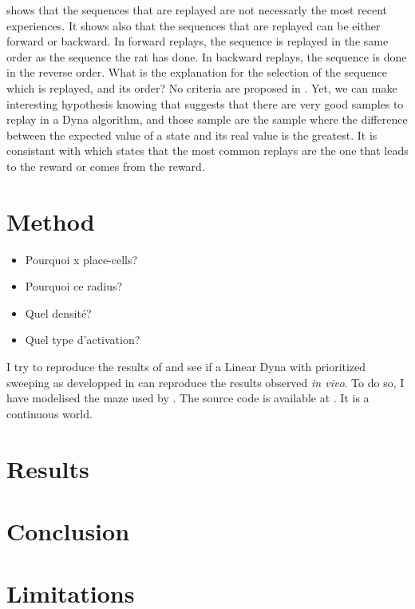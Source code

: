 \documentclass[]{article}
\newcommand\bla[1]{\ifthenelse{\isempty{#1}}{\hl{**~bla~bla~**}}{\hl{**~#1~**}}}
\begin{document}
\textcite{gupta_hippocampal_2010} shows that the sequences that are replayed are not necessarly the most recent experiences. It shows also that the sequences that are replayed can be either forward or backward. In forward replays, the sequence is replayed in the same order as the sequence the rat has done. In backward replays, the sequence is done in the reverse order. What is the explanation for the selection of the sequence which is replayed, and its order? No criteria are proposed in \textcite{gupta_hippocampal_2010}. Yet, we can make interesting hypothesis knowing that \textcite{sutton_dyna-style_2012} suggests that there are very good samples to replay in a Dyna algorithm, and those sample are the sample where the difference between the expected value of a state and its real value is the greatest. It is consistant with \textcite{gupta_hippocampal_2010} which states that the most common replays are the one that leads to the reward or comes from the reward.

\section{Method}\label{method}
\begin{itemize}
  \item Pourquoi x place-cells?
  \item Pourquoi ce radius?
  \item Quel densité?
  \item Quel type d'activation?
\end{itemize}

I try to reproduce the results of \textcite{gupta_hippocampal_2010} and see if a Linear Dyna with prioritized sweeping as developped in \textcite{sutton_dyna-style_2012} can reproduce the results observed \emph{in vivo}. To do so, I have modelised the maze used by \textcite{gupta_hippocampal_2010}. The source code is available at \bla{github}. It is a continuous world.

\section{Results}\label{results}

\section{Conclusion}\label{conclusion}

\section{Limitations}\label{limitations}


\printbibliography{}
\end{document}
